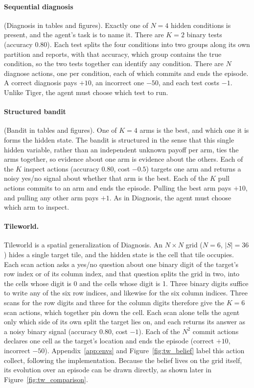 \paragraph{Sequential diagnosis} (Diagnosis in tables and figures). Exactly one of $N{=}4$ hidden conditions is present, and the agent's task is to name it. There are $K{=}2$ binary tests (accuracy 0.80). Each test splits the four conditions into two groups along its own partition and reports, with that accuracy, which group contains the true condition, so the two tests together can identify any condition. There are $N$ diagnose actions, one per condition, each of which commits and ends the episode. A correct diagnosis pays $+10$, an incorrect one $-50$, and each test costs $-1$. Unlike Tiger, the agent must choose which test to run.

\paragraph{Structured bandit} (Bandit in tables and figures). One of $K{=}4$ arms is the best, and which one it is forms the hidden state. The bandit is structured in the sense that this single hidden variable, rather than an independent unknown payoff per arm, ties the arms together, so evidence about one arm is evidence about the others. Each of the $K$ inspect actions (accuracy 0.80, cost $-0.5$) targets one arm and returns a noisy yes/no signal about whether that arm is the best. Each of the $K$ pull actions commits to an arm and ends the episode. Pulling the best arm pays $+10$, and pulling any other arm pays $+1$. As in Diagnosis, the agent must choose which arm to inspect.

\paragraph{Tileworld.} Tileworld is a spatial generalization of Diagnosis. An $N{\times}N$ grid ($N{=}6$, $|S|{=}36$) hides a single target tile, and the hidden state is the cell that tile occupies. Each scan action asks a yes/no question about one binary digit of the target's row index or of its column index, and that question splits the grid in two, into the cells whose digit is 0 and the cells whose digit is 1. Three binary digits suffice to write any of the six row indices, and likewise for the six column indices. Three scans for the row digits and three for the column digits therefore give the $K{=}6$ scan actions, which together pin down the cell. Each scan alone tells the agent only which side of its own split the target lies on, and each returns its answer as a noisy binary signal (accuracy $0.80$, cost $-1$). Each of the $N^2$ commit actions declares one cell as the target's location and ends the episode (correct $+10$, incorrect $-50$). Appendix~\ref{app:envs} and Figure~\ref{fig:tw_belief} label this action collect, following the implementation. Because the belief lives on the grid itself, its evolution over an episode can be drawn directly, as shown later in Figure~\ref{fig:tw_comparison}.


